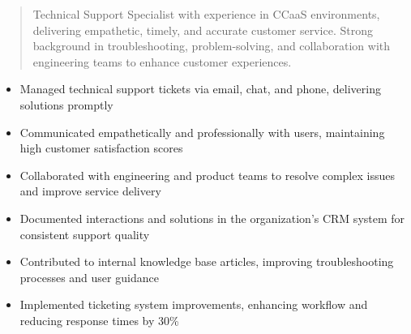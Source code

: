 



\makecvheader

\begin{quote}
  \noindent
  Technical Support Specialist with experience in CCaaS environments, delivering empathetic, timely, and accurate customer service. Strong background in troubleshooting, problem-solving, and collaboration with engineering teams to enhance customer experiences.
\end{quote}

\par\smallskip
\noindent
\begin{minipage}{20cm}
  \begin{minipage}{9.75cm}
    \begin{itemize}
      \item Managed technical support tickets via email, chat, and phone, delivering solutions promptly
      \item Communicated empathetically and professionally with users, maintaining high customer satisfaction scores
      \item Collaborated with engineering and product teams to resolve complex issues and improve service delivery
      \item Documented interactions and solutions in the organization's CRM system for consistent support quality
    \end{itemize}
  \end{minipage}
  \hfill
  \begin{minipage}{9.75cm}
    \begin{itemize}
      \item Contributed to internal knowledge base articles, improving troubleshooting processes and user guidance
      \item Implemented ticketing system improvements, enhancing workflow and reducing response times by 30\%
    \end{itemize}
  \end{minipage}
\end{minipage}
\par\smallskip
\divider

